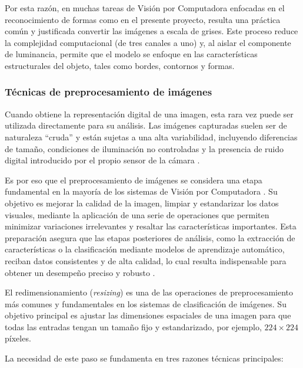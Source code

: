 	Por esta razón, en muchas tareas de Visión por Computadora enfocadas en el reconocimiento de formas como en el presente proyecto, resulta una práctica común y justificada convertir las imágenes a escala de grises. Este proceso reduce la complejidad computacional (de tres canales a uno) y, al aislar el componente de luminancia, permite que el modelo se enfoque en las características estructurales del objeto, tales como bordes, contornos y formas\cite{ballester2022, xian2025}.
	
	\subsubsection{Técnicas de preprocesamiento de imágenes}
	
	Cuando obtiene la representación digital de una imagen, esta rara vez puede ser utilizada directamente para su análisis. Las imágenes capturadas suelen ser de naturaleza “cruda” y están sujetas a una alta variabilidad, incluyendo diferencias de tamaño, condiciones de iluminación no controladas y la presencia de ruido digital introducido por el propio sensor de la cámara \cite{cantero_vision, gonzalez2018}.
	
	Es por eso que el preprocesamiento de imágenes se considera una etapa fundamental en la mayoría de los sistemas de Visión por Computadora \cite{szeliski2022, gonzalez2018}. Su objetivo es mejorar la calidad de la imagen, limpiar y estandarizar los datos visuales, mediante la aplicación de una serie de operaciones que permiten minimizar variaciones irrelevantes y resaltar las características importantes. Esta preparación asegura que las etapas posteriores de análisis, como la extracción de características o la clasificación mediante modelos de aprendizaje automático, reciban datos consistentes y de alta calidad, lo cual resulta indispensable para obtener un desempeño preciso y robusto \cite{cantero_vision, szeliski2022, gonzalez2018}.
	
	El redimensionamiento (\textit{resizing}) es una de las operaciones de preprocesamiento más comunes y fundamentales en los sistemas de clasificación de imágenes. Su objetivo principal es ajustar las dimensiones espaciales de una imagen para que todas las entradas tengan un tamaño fijo y estandarizado, por ejemplo, $224 \times 224$ píxeles.
	
	La necesidad de este paso se fundamenta en tres razones técnicas principales:
	
